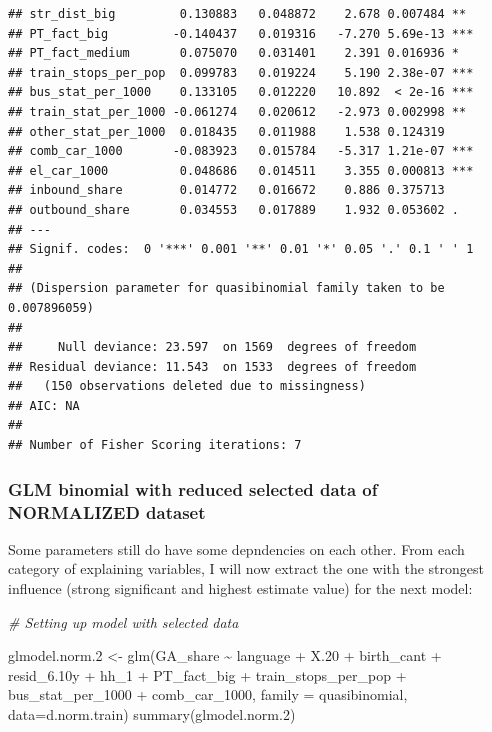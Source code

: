 \documentclass[
]{article}
\newenvironment{Shaded}{\begin{snugshade}}{\end{snugshade}}
\newcommand{\AttributeTok}[1]{\textcolor[rgb]{0.77,0.63,0.00}{#1}}
\newcommand{\CommentTok}[1]{\textcolor[rgb]{0.56,0.35,0.01}{\textit{#1}}}
\newcommand{\FloatTok}[1]{\textcolor[rgb]{0.00,0.00,0.81}{#1}}
\newcommand{\FunctionTok}[1]{\textcolor[rgb]{0.00,0.00,0.00}{#1}}
\newcommand{\NormalTok}[1]{#1}
\newcommand{\OtherTok}[1]{\textcolor[rgb]{0.56,0.35,0.01}{#1}}
\newcommand{\SpecialCharTok}[1]{\textcolor[rgb]{0.00,0.00,0.00}{#1}}
\begin{document}
\begin{verbatim}
## str_dist_big         0.130883   0.048872    2.678 0.007484 ** 
## PT_fact_big         -0.140437   0.019316   -7.270 5.69e-13 ***
## PT_fact_medium       0.075070   0.031401    2.391 0.016936 *  
## train_stops_per_pop  0.099783   0.019224    5.190 2.38e-07 ***
## bus_stat_per_1000    0.133105   0.012220   10.892  < 2e-16 ***
## train_stat_per_1000 -0.061274   0.020612   -2.973 0.002998 ** 
## other_stat_per_1000  0.018435   0.011988    1.538 0.124319    
## comb_car_1000       -0.083923   0.015784   -5.317 1.21e-07 ***
## el_car_1000          0.048686   0.014511    3.355 0.000813 ***
## inbound_share        0.014772   0.016672    0.886 0.375713    
## outbound_share       0.034553   0.017889    1.932 0.053602 .  
## ---
## Signif. codes:  0 '***' 0.001 '**' 0.01 '*' 0.05 '.' 0.1 ' ' 1
## 
## (Dispersion parameter for quasibinomial family taken to be 0.007896059)
## 
##     Null deviance: 23.597  on 1569  degrees of freedom
## Residual deviance: 11.543  on 1533  degrees of freedom
##   (150 observations deleted due to missingness)
## AIC: NA
## 
## Number of Fisher Scoring iterations: 7
\end{verbatim}

\hypertarget{glm-binomial-with-reduced-selected-data-of-normalized-dataset}{%
\subsubsection{GLM binomial with reduced selected data of NORMALIZED
dataset}\label{glm-binomial-with-reduced-selected-data-of-normalized-dataset}}

Some parameters still do have some depndencies on each other. From each
category of explaining variables, I will now extract the one with the
strongest influence (strong significant and highest estimate value) for
the next model:

\begin{Shaded}
\begin{Highlighting}[]
\CommentTok{\# Setting up model with selected data}

\NormalTok{glmodel.norm}\FloatTok{.2} \OtherTok{\textless{}{-}} \FunctionTok{glm}\NormalTok{(GA\_share }\SpecialCharTok{\textasciitilde{}}\NormalTok{ language }\SpecialCharTok{+}\NormalTok{ X}\FloatTok{.20} \SpecialCharTok{+}\NormalTok{ birth\_cant }\SpecialCharTok{+} 
\NormalTok{                  resid\_6}\FloatTok{.10}\NormalTok{y }\SpecialCharTok{+}\NormalTok{ hh\_1 }\SpecialCharTok{+}\NormalTok{ PT\_fact\_big }\SpecialCharTok{+}\NormalTok{ train\_stops\_per\_pop }\SpecialCharTok{+}\NormalTok{ bus\_stat\_per\_1000 }\SpecialCharTok{+} 
\NormalTok{      comb\_car\_1000, }\AttributeTok{family =}\NormalTok{ quasibinomial, }\AttributeTok{data=}\NormalTok{d.norm.train)}
\FunctionTok{summary}\NormalTok{(glmodel.norm}\FloatTok{.2}\NormalTok{)}
\end{Highlighting}
\end{Shaded}
\end{document}
